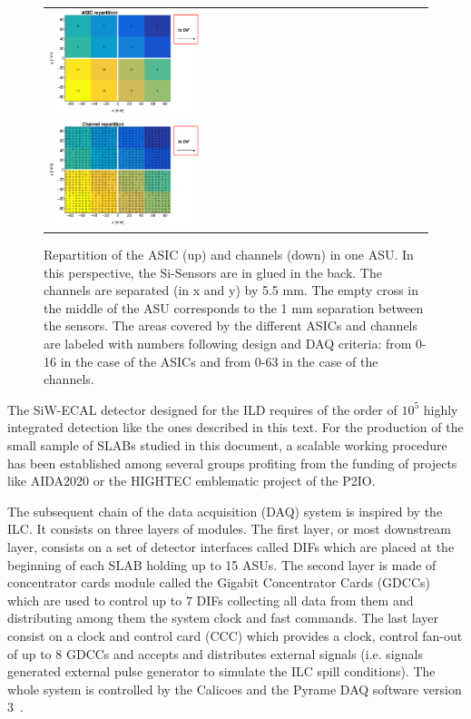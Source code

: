 \documentclass[final,3p,times,twocolumn]{elsarticle}
\begin{document}
\begin{figure}[!t]
  \centering
  \begin{tabular}{l}
    \includegraphics[width=0.4\textwidth]{../figs/ASU_geometry1.eps}  \\
    \includegraphics[width=0.4\textwidth]{../figs/ASU_geometry2.eps}  \\
  \end{tabular}
  \caption{Repartition of the ASIC (up) and channels (down) in one ASU. In this perspective, the Si-Sensors are in glued in the back.
    The channels are separated (in x and y) by 5.5 mm.
    The empty cross in the middle of the ASU corresponds to the 1 mm separation between the sensors.
    The areas covered by the different ASICs and channels
    are labeled with numbers following design and DAQ criteria: from 0-16 in the case of the ASICs and from 0-63 in the case of the channels.
  }
\label{ASU}
\end{figure}

The SiW-ECAL detector designed for the ILD requires of the order
of $10^{5}$ highly integrated detection like the ones described in this text.
For the production of the small sample of SLABs studied in this document,
a scalable working procedure has been established among several groups \cite{Boudry:2318814}
profiting from the funding of projects like AIDA2020 or the HIGHTEC emblematic project
of the P2IO.

The subsequent chain of the data acquisition (DAQ) system \cite{Gastaldi:2014vaa} is inspired by the ILC.
It consists on three layers of modules.
The first layer, or most downstream layer, consists on a set of detector interfaces called DIFs which are placed at the beginning of each SLAB holding up to 15 ASUs.
The second layer is made of concentrator cards module called the Gigabit Concentrator Cards (GDCCs)
which are used to control up to 7 DIFs collecting all data from them and distributing among them the system clock and fast commands.
The last layer consist on a clock and control card (CCC) which
provides a clock, control fan-out of up to 8 GDCCs and accepts and distributes external signals (i.e. signals
generated external pulse generator to simulate the ILC spill conditions).
The whole system is controlled by the Calicoes and the Pyrame DAQ software version 3~\cite{Rubio-Roy:2017ere,Magniette:2018wdz}.
\end{document}

